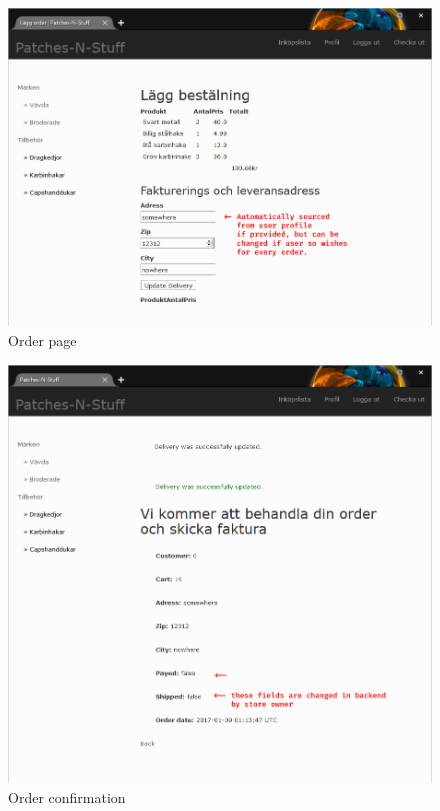 \documentclass[paper=a4, fontsize=11pt]{report} %
\begin{document}
\begin{figure}
	\includegraphics[width=0.9\paperwidth]{artifacts/stories/10_order.png}
	\caption{Order page}
	\label{fig:order}
\end{figure}

\begin{figure}
	\includegraphics[width=0.9\paperwidth]{artifacts/stories/11_order_confirmation.png}
	\caption{Order confirmation}
	\label{fig:order_confirmation}
\end{figure}
\end{document}
